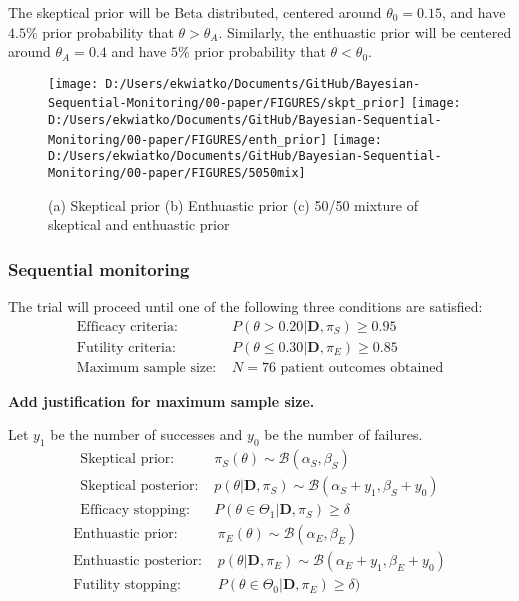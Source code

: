 \documentclass[12pt]{article}
\begin{document}
The skeptical prior will be Beta distributed, centered around $\theta_0=0.15$, and have $4.5\%$ prior probability that $\theta>\theta_A$. Similarly, the enthuastic prior will be centered around $\theta_A=0.4$ and have $5\%$ prior probability that $\theta<\theta_0$.
\newpage
\begin{figure}
\texttt{[image: D:/Users/ekwiatko/Documents/GitHub/Bayesian-Sequential-Monitoring/00-paper/FIGURES/skpt\_prior]}
\texttt{[image: D:/Users/ekwiatko/Documents/GitHub/Bayesian-Sequential-Monitoring/00-paper/FIGURES/enth\_prior]}
\texttt{[image: D:/Users/ekwiatko/Documents/GitHub/Bayesian-Sequential-Monitoring/00-paper/FIGURES/5050mix]}
\caption{(a) Skeptical prior (b) Enthuastic prior (c) 50/50 mixture of skeptical and enthuastic prior}
\end{figure}

\newpage
\subsubsection{Sequential monitoring}
The trial will proceed until one of the following three conditions are satisfied:
\begin{align*}
\text{Efficacy criteria: }&P(\theta>0.20|\mathbf{D},\pi_S)\geq 0.95\\
\text{Futility criteria: }&P(\theta\leq 0.30|\mathbf{D},\pi_E)\geq 0.85\\
\text{Maximum sample size: }&N=76 \text{ patient outcomes obtained}
\end{align*}

\textbf{Add justification for maximum sample size.}

Let $y_1$ be the number of successes and $y_0$ be the number of failures.
\begin{align*}
\text{Skeptical prior: }&\pi_S(\theta)\sim\mathcal{B}(\alpha_S,\beta_S)\\
\text{Skeptical posterior: }&p(\theta|\mathbf{D},\pi_S)\sim\mathcal{B}(\alpha_S+y_1,\beta_S+y_0)\\
\text{Efficacy stopping: }&P(\theta\in\Theta_1|\mathbf{D}, \pi_{S})\geq\delta%
\end{align*}
\begin{align*}
\text{Enthuastic prior: }&\pi_E(\theta)\sim\mathcal{B}(\alpha_E,\beta_E)\\
\text{Enthuastic posterior: }&p(\theta|\mathbf{D},\pi_E)\sim\mathcal{B}(\alpha_E+y_1,\beta_E+y_0)\\
\text{Futility stopping: } &P(\theta\in\Theta_0|\mathbf{D}, \pi_{E})\geq\delta)%
\end{align*}
\newpage
\end{document}
